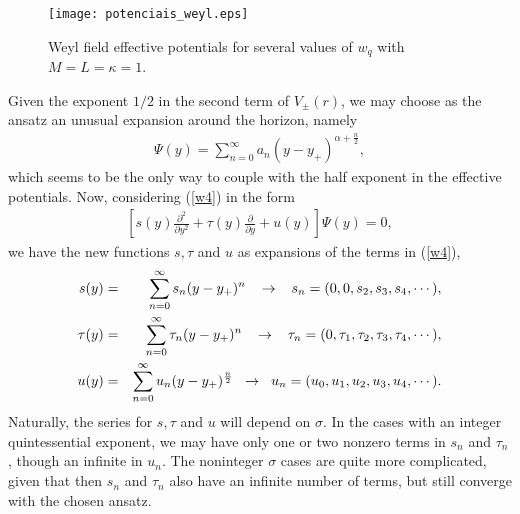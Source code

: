\documentclass[preprint]{revtex4-1}
\def\be{\begin{eqnarray}}
\def\ee{\end{eqnarray}}
\begin{document}


\begin{figure}[htp!]\label{potenciais_weyl}
\centering
\texttt{[image: potenciais\_weyl.eps]}
\caption{Weyl field effective potentials for several values of $w_{q}$ with $M=L=\kappa=1$.}
\label{}
\end{figure}


Given the exponent $1/2$ in the second term of $V_\pm (r)$, we may choose as the ansatz an unusual expansion around the horizon, namely
\be
\label{w6}
\Psi (y) = \sum_{n=0}^{\infty}a_n(y-y_+)^{\alpha + \frac{n}{2}},
\ee
which seems to be the only way to couple with the half exponent in the effective potentials. Now, considering (\ref{w4}) in the form
\be
\label{w7}
\left[s(y)\frac{\partial^2}{\partial y^2 } + \tau  (y) \frac{\partial}{\partial y} + u(y) \right]\Psi(y)=0, 
\ee
we have the new functions $s, \tau$ and $u$ as expansions of the terms in (\ref{w4}),
\be
\nonumber
s(y) & = & \sum_{n=0}^{\infty}s_n(y-y_+)^n \hspace{0.3cm} \rightarrow \hspace{0.3cm} s_n= (0,0,s_2,s_3, s_4, \cdots ), \\
\nonumber
\tau(y) & = & \sum_{n=0}^{\infty}\tau_n(y-y_+)^n \hspace{0.3cm} \rightarrow \hspace{0.3cm} \tau_n= (0,\tau_1,\tau_2,\tau_3, \tau_4, \cdots ),\\
\label{w8}
u(y) & = & \sum_{n=0}^{\infty}u_n(y-y_+)^{\frac{n}{2}} \hspace{0.2cm} \rightarrow \hspace{0.2cm} u_n= (u_0,u_1,u_2,u_3, u_4, \cdots ).
\ee
Naturally, the series for $s, \tau$ and $u$ will depend on $\sigma$. In the cases with an integer quintessential exponent, we may have only one or two nonzero terms in $s_n$ and $\tau_n$, though an infinite in $u_n$. The noninteger $\sigma$ cases are quite more complicated, given that then $s_n$ and $\tau_n$ also have an infinite number of terms, but still converge with the chosen ansatz. 
\end{document}

